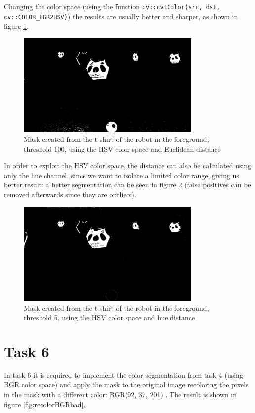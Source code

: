 \documentclass{article}
\begin{document}
Changing the color space (using the function \texttt{cv::cvtColor(src, dst, cv::COLOR\_BGR2HSV)}) the results are usually better and sharper, as shown in figure \ref{fig:maskHSVeuclideandist}.
\begin{figure}[H]
	\centering
	\includegraphics[width=0.8\textwidth]{robocup_maskHSVeuclideandist100shirt.jpg}
	\caption{Mask created from the t-shirt of the robot in the foreground, threshold 100, using the HSV color space and Euclidean distance}
	\label{fig:maskHSVeuclideandist}
\end{figure}

In order to exploit the HSV color space, the distance can also be calculated using only the hue channel, since we want to isolate a limited color range, giving us better result: a better segmentation can be seen in figure \ref{fig:maskHSVhuedist} (false positives can be removed afterwards since they are outliers).
\begin{figure}[H]
	\centering
	\includegraphics[width=0.8\textwidth]{robocup_maskHSVhuedist5shirt.jpg}
	\caption{Mask created from the t-shirt of the robot in the foreground, threshold 5, using the HSV color space and hue distance}
	\label{fig:maskHSVhuedist}
\end{figure}


\section*{Task 6}
In task 6 it is required to implement the color segmentation from task 4 (using BGR color space) and apply the mask to the original image recoloring the pixels in the mask with a different color: BGR(92, 37, 201)  . The result is shown in figure \ref{fig:recolorBGRbad}.
\end{document}
